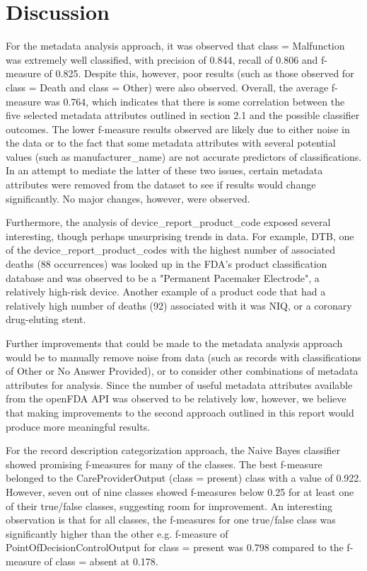 \documentclass[11pt, notitlepage,abstracton,oneside]{article}   	%
\begin{document}
\section{Discussion}

For the metadata analysis approach, it was observed that class = Malfunction was extremely well classified, with precision of 0.844, recall of 0.806 and f-measure of 0.825. Despite this, however, poor results (such as those observed for class = Death and class = Other) were also observed. Overall, the average f-measure was 0.764, which indicates that there is some correlation between the five selected metadata attributes outlined in section 2.1 and the possible classifier outcomes. The lower f-measure results observed are likely due to either noise in the data or to the fact that some metadata attributes with several potential values (such as manufacturer\_name) are not accurate predictors of classifications. In an attempt to mediate the latter of these two issues, certain metadata attributes were removed from the dataset to see if results would change significantly. No major changes, however, were observed.

Furthermore, the analysis of device\_report\_product\_code exposed several interesting, though perhaps unsurprising trends in data. For example, DTB, one of the device\_report\_product\_codes with the highest number of associated deaths (88 occurrences) was looked up in the FDA's product classification database and was observed to be a "Permanent Pacemaker Electrode", a relatively high-risk device. Another example of a product code that had a relatively high number of deaths (92) associated with it was NIQ, or a coronary drug-eluting stent.

Further improvements that could be made to the metadata analysis approach would be to manually remove noise from data (such as records with classifications of Other or No Answer Provided), or to consider other combinations of metadata attributes for analysis. Since the number of useful metadata attributes available from the openFDA API was observed to be relatively low, however, we believe that making improvements to the second approach outlined in this report would produce more meaningful results.

For the record description categorization approach, the Naive Bayes classifier showed promising f-measures for many of the classes. The best f-measure belonged to the CareProviderOutput (class = present) class with a value of 0.922. However, seven out of nine classes showed f-measures below 0.25 for at least one of their true/false classes, suggesting room for improvement. An interesting observation is that for all classes, the f-measures for one true/false class was significantly higher than the other e.g. f-measure of PointOfDecisionControlOutput for class = present was 0.798 compared to the f-measure of class = absent at 0.178.
\end{document}

